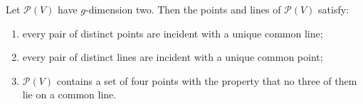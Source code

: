 Let $\mathcal{P}(V)$ have $g$-dimension two. Then the points and lines of $\mathcal{P}(V)$ satisfy:
\begin{enumerate}
\item[(i)] every pair of distinct points are incident with a unique common line;
\item[(ii)] every pair of distinct lines are incident with a unique common point;
\item[(iii)] $\mathcal{P}(V)$ contains a set of four points with the property that no three of them lie on a common line.
\end{enumerate}
